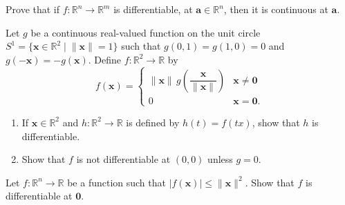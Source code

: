 \documentclass[12 pt, letterpaper]{hmcpset}
\begin{document}
\begin{problem}[1.]
	Prove that if $f : \mathbb{R}^{n} \to \mathbb{R}^{m}$ is differentiable, at $\mathbf{a} \in \mathbb{R}^{n}$, then it is continuous at $\mathbf{a}$.
\end{problem}

\pagebreak

\begin{problem}[4.]
	Let $g$ be a continuous real-valued function on the unit circle $S^{1} = \{ \mathbf{x} \in \mathbb{R}^{2}\mid \lVert \mathbf{x} \rVert = 1 \}$ such that $g(0, 1) = g(1, 0) = 0$ and $g(-\mathbf{x}) = - g(\mathbf{x})$. Define $f : \mathbb{R}^{2} \to \mathbb{R}$ by
	\[
		f(\mathbf{x}) = \begin{cases}
			\lVert \mathbf{x} \rVert \, g \left ( \dfrac{\mathbf{x}}{\lVert \mathbf{x} \rVert} \right ) & \mathbf{x} \neq \mathbf{0} \\
			0 & \mathbf{x} = \mathbf{0}.
		\end{cases}
	\]
	\begin{enumerate}
		\item If $\mathbf{x} \in \mathbb{R}^{2}$ and $h : \mathbb{R}^{2} \to \mathbb{R}$ is defined by $h(t) = f(tx)$, show that $h$ is differentiable.
		\item Show that $f$ is not differentiable at $(0, 0)$ unless $g = 0$.
	\end{enumerate}
\end{problem}

\pagebreak

\begin{problem}[7.]
	Let $f : \mathbb{R}^{n} \to \mathbb{R}$ be a function such that $\lvert f(\mathbf{x}) \rvert \le \lVert \mathbf{x} \rVert^{2}$. Show that $f$ is differentiable at $\mathbf{0}$.
\end{problem}

\pagebreak
\end{document}
